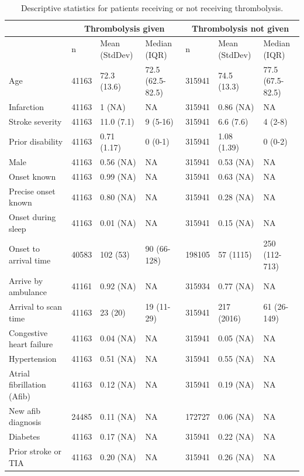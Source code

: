 \begin{minipage}{1\textwidth}
\small
\begin{longtable}[]{@{}l | lll | lll @{}}
\caption{Descriptive statistics for patients receiving or not receiving thrombolysis.}\\
\toprule\noalign{}
& \multicolumn{3}{c|}{Thrombolysis given} & \multicolumn{3}{c}{Thrombolysis not given} \\ 
\endhead
\bottomrule\noalign{}
\endlastfoot

& n & Mean (StdDev) & Median (IQR) & n & Mean (StdDev) & Median (IQR) \\
\midrule\noalign{}
Age & 41163 & 72.3 (13.6) & 72.5 (62.5-82.5) & 315941 & 74.5 (13.3) & 77.5 (67.5-82.5) \\
Infarction & 41163 & 1 (NA) & NA & 315941 & 0.86 (NA) & NA \\
Stroke severity & 41163 & 11.0 (7.1) & 9 (5-16) & 315941 & 6.6 (7.6) & 4 (2-8) \\
Prior disability & 41163 & 0.71 (1.17) & 0 (0-1) & 315941 & 1.08 (1.39) & 0 (0-2) \\
Male & 41163 & 0.56 (NA) & NA & 315941 & 0.53 (NA) & NA \\
Onset known & 41163 & 0.99 (NA) & NA & 315941 & 0.63 (NA) & NA \\
Precise onset known & 41163 & 0.80 (NA) & NA & 315941 & 0.28 (NA) & NA \\
Onset during sleep & 41163 & 0.01 (NA) & NA & 315941 & 0.15 (NA) & NA \\
Onset to arrival time & 40583 & 102 (53) & 90 (66-128) & 198105 & 57 (1115) & 250 (112-713) \\
Arrive by ambulance & 41161 & 0.92 (NA) & NA & 315934 & 0.77 (NA) & NA \\
Arrival to scan time & 41163 & 23 (20) & 19 (11-29) & 315941 & 217 (2016) & 61 (26-149) \\
Congestive heart failure & 41163 & 0.04 (NA) & NA & 315941 & 0.05 (NA) & NA \\
Hypertension & 41163 & 0.51 (NA) & NA & 315941 & 0.55 (NA) & NA \\
Atrial fibrillation (Afib) & 41163 & 0.12 (NA) & NA & 315941 & 0.19 (NA) & NA \\
New afib diagnosis & 24485 & 0.11 (NA) & NA & 172727 & 0.06 (NA) & NA \\
Diabetes & 41163 & 0.17 (NA) & NA & 315941 & 0.22 (NA) & NA \\
Prior stroke or TIA & 41163 & 0.20 (NA) & NA & 315941 & 0.26 (NA) & NA \\

\end{longtable}
\end{minipage}
